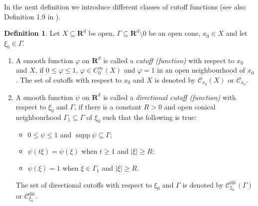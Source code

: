 \documentclass[12pt,a4paper,reqno]{amsart}
\numberwithin{equation}{section}
\numberwithin{thm}{section}
\theoremstyle{definition}
\newtheorem{defn}[thm]{Definition}
\theoremstyle{remark}
\begin{document}
\par

In the next definition we introduce different classes of cutoff
functions (see also Definition 1.9 in \cite{CJT1}).

\par

\begin{defn}\label{cuttdef}
Let $X\subseteq {\mathbf R^{d}}$ be open, $\Gamma \subseteq {\mathbf R^{d}}\setminus 0$ be an open cone, $x_0\in X$ and let
$\xi _0\in \Gamma$.

\begin{enumerate}
\item A smooth function ${\varphi}$ on ${\mathbf R^{d}}$ is called a \emph{cutoff
(function)} with respect to $x_0$ and $X$, if $0\le {\varphi} \le 1$, ${\varphi} \in
C_0^\infty (X)$ and ${\varphi} =1$ in an open neighbourhood of $x_0$. The
set of cutoffs with respect to $x_0$ and $X$ is denoted by
$\mathscr C_{x_0}(X)$ or $\mathscr C_{x_0}$.

{\vspace{0.1cm}}

\item  A smooth function $\psi$ on ${\mathbf R^{d}}$ is called a
\emph{directional cutoff (function)} with respect to $\xi_0$ and
$\Gamma$, if there is a constant $R>0$ and open conical neighbourhood
$\Gamma _1\subseteq \Gamma$ of $\xi _0$ such that the following is
true:
\begin{itemize}
\item $0\le \psi \le 1$ and ${\operatorname{supp}} \psi \subseteq \Gamma$;

{\vspace{0.1cm}}

\item  $\psi (t\xi )=\psi (\xi )$ when $t\ge 1$ and $|\xi |\ge R$;

{\vspace{0.1cm}}

\item $\psi (\xi )=1$ when $\xi \in \Gamma _1$ and $|\xi |\ge R$.
\end{itemize}

\par

The set of directional cutoffs with respect to $\xi _0$ and
$\Gamma$ is denoted by $\mathscr C^{{\operatorname{dir}}}  _{\xi _0}(\Gamma )$ or
$\mathscr C^{{\operatorname{dir}}}  _{\xi _0}$.
\end{enumerate}
\end{defn}
\end{document}

